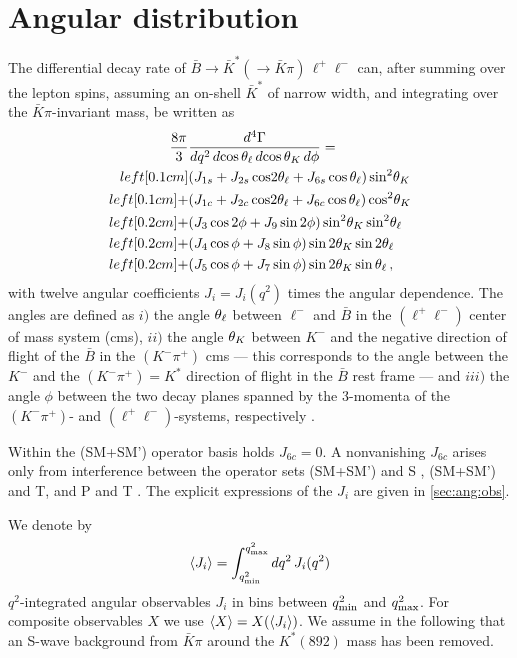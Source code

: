%
%
\section{Angular distribution \label{sec:ang:dist}}

The differential decay rate of $\bar{B}\to\bar{K}^* (\to \bar{K}\pi)\,
\ell^+\ell^-$ can, after summing over the lepton spins, assuming an  on-shell $\bar{K}^*$
of narrow width, and integrating
over the $\bar{K}\pi$-invariant mass, be written as
\begin{equation}
\begin{split}
  \frac{8 \pi}{3} & \frac{d^4 \Gamma}{d q^2\, d\!\cos\thl\, d\!\cos\thK\, d\phi} = 
\\left\lbrack0.1cm]
    & (J_{1s} + J_{2s} \cos\!2\thl + J_{6s} \cos\thl) \sin^2\!\thK
\\left\lbrack0.1cm]
  + & (J_{1c} + J_{2c} \cos\!2\thl + J_{6c} \cos\thl) \cos^2\!\thK  
\\left\lbrack0.2cm]
  + & (J_3 \cos 2\phi + J_9 \sin 2\phi) \sin^2\!\thK \sin^2\!\thl
\\left\lbrack0.2cm] 
  + & (J_4 \cos\phi + J_8  \sin\phi) \sin 2\thK \sin 2\thl 
\\left\lbrack0.2cm]
  + & (J_5 \cos\phi  + J_7 \sin\phi ) \sin 2\thK \sin\thl \, ,
\end{split}
\label{eq:anganal}
\end{equation}
with twelve angular coefficients $J_i=J_i(q^2)$ times the angular
dependence. The angles are defined as $i)$ the angle ${\theta_\ell}$ between $\ell^-$ and
$\bar{B}$ in the $(\ell^+\ell^-)$ center of mass system (cms), $ii)$ the angle
${\theta_{K}}$ between $K^-$ and the negative direction of flight of the $\bar{B}$ in the 
$(K^-\pi^+)$ cms --- this corresponds to the angle between the $K^-$ and
the $(K^-\pi^+)=K^*$ direction of flight in the $\bar{B}$ rest frame --- and 
$iii)$ the angle $\phi$ between the two decay planes spanned by the 3-momenta
of the $(K^-\pi^+)$- and $(\ell^+\ell^-)$-systems, respectively 
\cite{Bobeth:2008ij, Altmannshofer:2008dz, Kruger:1999xa, Kruger:2005ep}.

Within the (SM+SM') operator basis holds $J_{6c} = 0$. A nonvanishing $J_{6c}$
arises only from interference between the operator sets (SM+SM') and S
\cite{Altmannshofer:2008dz}, (SM+SM') and T, and P and T \cite{Alok:2010zd}.
The explicit expressions of the $J_i$ are given in \ref{sec:ang:obs}.

We denote by 
\begin{align} \label{eq:aveX}
  \braket{J_i} = \int_{q^2_{\rm min}}^{q^2_{\rm max}} dq^2\, J_i(q^2) 
\end{align}
$q^2$-integrated angular observables $J_i$ in bins between $q^2_{\rm min}$ and $q^2_{\rm
  max}$.  For composite observables $X$ we use
  $\braket{X}=X(\braket{J_i})$. We assume in the following that an S-wave background from $\bar K \pi$
around the $K^*(892)$ mass has been removed.

